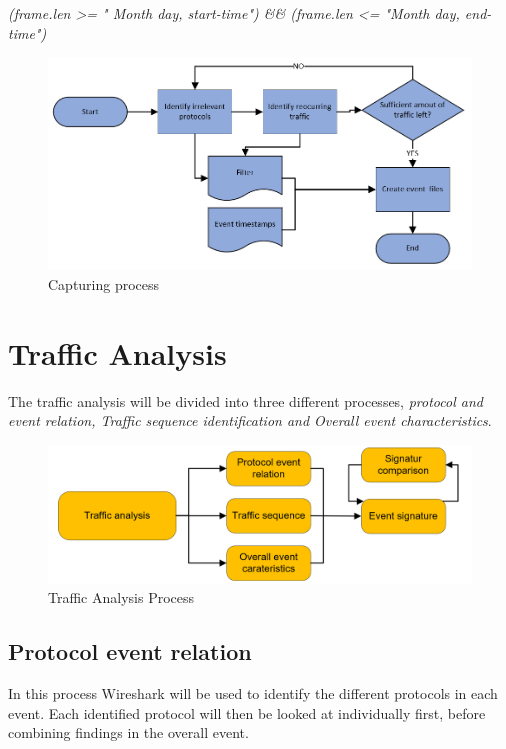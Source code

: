 \textit{(frame.len >= " Month day, start-time") \&\& (frame.len <= "Month day, end-time")}

\begin{figure}[H]
    \centering
    \includegraphics[width=\textwidth]{figures/TrafficprocessingFilter.png}
    \caption{Capturing process}
    \label{fig:<trafficProcessFilter}
\end{figure}

\section{Traffic Analysis}
The traffic analysis will be divided into three different processes, \textit{protocol and event relation, Traffic sequence identification and Overall event characteristics}. 

\begin{figure}[H]
    \centering
    \includegraphics[width=\textwidth]{figures/TrafficAnalysisProcess.png}
    \caption{Traffic Analysis Process}
    \label{fig:TrafficAnalysisProcess}
\end{figure}

\subsection{Protocol event relation}
In this process Wireshark will be used to identify the different protocols in each event. Each identified protocol will then be looked at individually first, before combining findings in the overall event.

